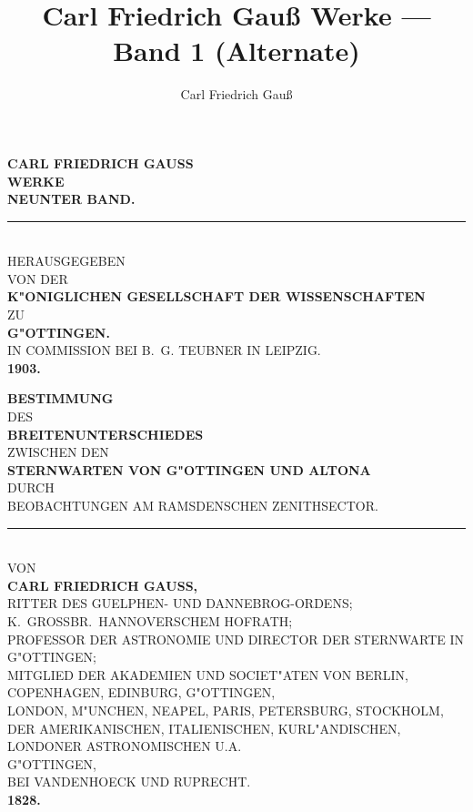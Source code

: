 \documentclass[12pt,a4paper]{article}
\title{Carl Friedrich Gau\ss{} Werke --- Band 1 (Alternate)}
\author{Carl Friedrich Gau\ss}
\date{}
\theoremstyle{plain}
\theoremstyle{definition}
\theoremstyle{remark}
\begin{document}
\maketitle

\thispagestyle{empty}
\begin{center}
\vspace*{2cm}
{\Large\bfseries CARL FRIEDRICH GAUSS}\\[1cm]
{\Huge\bfseries WERKE}\\[1.5cm]
{\Large\bfseries NEUNTER BAND.}\\[2cm]
\rule{5cm}{0.4pt}\\[1.5cm]
{\normalsize HERAUSGEGEBEN}\\[0.3cm]
{\normalsize VON DER}\\[0.3cm]
{\large\bfseries K"ONIGLICHEN GESELLSCHAFT DER WISSENSCHAFTEN}\\[0.3cm]
{\normalsize ZU}\\[0.3cm]
{\large\bfseries G"OTTINGEN.}\\[0.5cm]
{\small IN COMMISSION BEI B.~G. TEUBNER IN LEIPZIG.}\\[0.3cm]
{\bfseries 1903.}
\end{center}
\newpage

\thispagestyle{empty}
\begin{center}
\vspace*{1cm}
{\Large\bfseries BESTIMMUNG}\\[0.5cm]
{\large DES}\\[0.5cm]
{\Large\bfseries BREITENUNTERSCHIEDES}\\[0.8cm]
{\normalsize ZWISCHEN DEN}\\[0.3cm]
{\Large\bfseries STERNWARTEN VON G"OTTINGEN UND ALTONA}\\[0.5cm]
{\normalsize DURCH}\\[0.3cm]
{\Large BEOBACHTUNGEN AM RAMSDENSCHEN ZENITHSECTOR.}\\[1.5cm]
\rule{3cm}{0.4pt}\\[1cm]
{\normalsize VON}\\[0.3cm]
{\large\bfseries CARL FRIEDRICH GAUSS,}\\[0.5cm]
{\small
RITTER DES GUELPHEN- UND DANNEBROG-ORDENS;
K.~GROSSBR.~HANNOVERSCHEM HOFRATH;\\
PROFESSOR DER ASTRONOMIE UND DIRECTOR DER STERNWARTE IN G"OTTINGEN;\\
MITGLIED DER AKADEMIEN UND SOCIET"ATEN VON BERLIN, COPENHAGEN,
EDINBURG, G"OTTINGEN,\\
LONDON, M"UNCHEN, NEAPEL, PARIS, PETERSBURG, STOCKHOLM,\\[0.3cm]
DER AMERIKANISCHEN, ITALIENISCHEN, KURL"ANDISCHEN, LONDONER
ASTRONOMISCHEN U.A.
}\\[1cm]
{\normalsize G"OTTINGEN,}\\[0.2cm]
{\normalsize BEI VANDENHOECK UND RUPRECHT.}\\[0.3cm]
{\bfseries 1828.}
\end{center}
\newpage
\end{document}
